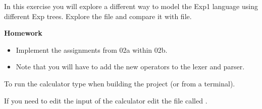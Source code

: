 In this exercise you will explore a different way to model the Exp1 language
using different Exp trees.
Explore the  file and compare it with  file.

{\bf Homework}
\begin{itemize}
\item Implement the assignments from 02a within 02b.
\item Note that you will have to add the new operators to the lexer and parser.
\end{itemize}

To run the calculator type  when building the project (or  from a terminal).

If you need to edit the input of the calculator edit the file called .
